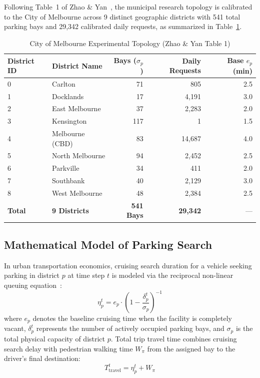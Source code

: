 \documentclass[journal]{IEEEtran}
\begin{document}
Following Table~1 of Zhao \& Yan~\cite{zhao2025deep}, the municipal research topology is calibrated to the City of Melbourne across 9 distinct geographic districts with 541 total parking bays and 29,342 calibrated daily requests, as summarized in Table~\ref{tab:melbourne_spec}.

\begin{table}[t]
\caption{City of Melbourne Experimental Topology (Zhao \& Yan Table 1)}
\label{tab:melbourne_spec}
\centering
\begin{tabular}{llrrr}
\toprule
\textbf{District ID} & \textbf{District Name} & \textbf{Bays ($\sigma_p$)} & \textbf{Daily Requests} & \textbf{Base $e_p$ (min)} \\
\midrule
0 & Carlton & 71 & 805 & 2.5 \\
1 & Docklands & 17 & 4,191 & 3.0 \\
2 & East Melbourne & 37 & 2,283 & 2.0 \\
3 & Kensington & 117 & 1 & 1.5 \\
4 & Melbourne (CBD) & 83 & 14,687 & 4.0 \\
5 & North Melbourne & 94 & 2,452 & 2.5 \\
6 & Parkville & 34 & 411 & 2.0 \\
7 & Southbank & 40 & 2,129 & 3.0 \\
8 & West Melbourne & 48 & 2,384 & 2.5 \\
\midrule
\textbf{Total} & \textbf{9 Districts} & \textbf{541 Bays} & \textbf{29,342} & --- \\
\bottomrule
\end{tabular}
\end{table}

\subsection{Mathematical Model of Parking Search}
In urban transportation economics, cruising search duration for a vehicle seeking parking in district $p$ at time step $t$ is modeled via the reciprocal non-linear queuing equation~\cite{shoup2005high,arnott2006economic}:
\begin{equation}
\eta_p^t = e_p \cdot \left(1 - \frac{\delta_p^t}{\sigma_p}\right)^{-1}
\label{eq:reciprocal_delay}
\end{equation}
where $e_p$ denotes the baseline cruising time when the facility is completely vacant, $\delta_p^t$ represents the number of actively occupied parking bays, and $\sigma_p$ is the total physical capacity of district $p$. Total trip travel time combines cruising search delay with pedestrian walking time $W_{\pi}$ from the assigned bay to the driver's final destination:
\begin{equation}
T_{\text{travel}}^t = \eta_p^t + W_{\pi}
\label{eq:total_travel}
\end{equation}
\end{document}
